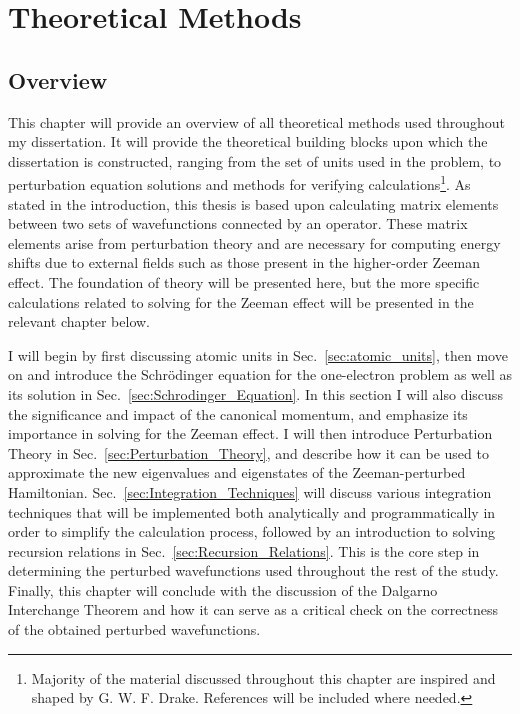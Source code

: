 \chapter{Theoretical Methods} \label{Theoretical_Methods}
    \section{Overview}
        This chapter will provide an overview of all theoretical methods used throughout my dissertation. It will provide the theoretical building blocks upon which the dissertation is constructed, ranging from the set of units used in the problem, to perturbation equation solutions and methods for verifying calculations\footnote{Majority of the material discussed throughout this chapter are inspired and shaped by G. W. F. Drake. References will be included where needed.}. As stated in the introduction, this thesis is based upon calculating matrix elements between two sets of wavefunctions connected by an operator. These matrix elements arise from perturbation theory and are necessary for computing energy shifts due to external fields such as those present in the higher-order Zeeman effect. The foundation of theory will be presented here, but the more specific calculations related to solving for the Zeeman effect will be presented in the relevant chapter below.

        I will begin by first discussing atomic units in Sec.~\ref{sec:atomic_units}, then move on and introduce the Schrödinger equation for the one-electron problem as well as its solution in Sec.~\ref{sec:Schrodinger_Equation}. In this section I will also discuss the significance and impact of the canonical momentum, and emphasize its importance in solving for the Zeeman effect. I will then introduce Perturbation Theory in Sec.~\ref{sec:Perturbation_Theory}, and describe how it can be used to approximate the new eigenvalues and eigenstates of the Zeeman-perturbed Hamiltonian. Sec.~\ref{sec:Integration_Techniques} will discuss various integration techniques that will be implemented both analytically and programmatically in order to simplify the calculation process, followed by an introduction to solving recursion relations in Sec.~\ref{sec:Recursion_Relations}. This is the core step in determining the perturbed wavefunctions used throughout the rest of the study. Finally, this chapter will conclude with the discussion of the Dalgarno Interchange Theorem and how it can serve as a critical check on the correctness of the obtained perturbed wavefunctions.
